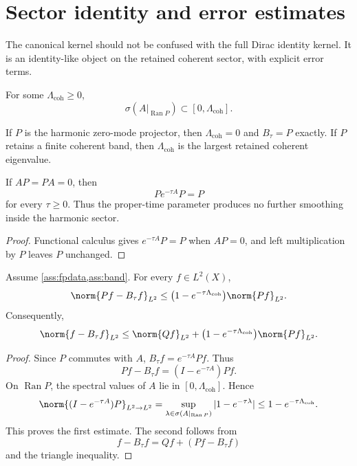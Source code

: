 \documentclass[11pt]{article}
\begin{document}
\section{Sector identity and error estimates}

The canonical kernel should not be confused with the full Dirac identity kernel. It is an
identity-like object on the retained coherent sector, with explicit error terms.

\begin{assumption}\label{ass:band}
For some \(\Lambda_{\mathrm{coh}}\ge 0\),
\[
        \sigma(A|_{\operatorname{Ran}P})\subset[0,\Lambda_{\mathrm{coh}}].
\]
\end{assumption}

\begin{remark}
If \(P\) is the harmonic zero-mode projector, then \(\Lambda_{\mathrm{coh}}=0\) and
\(B_\tau=P\) exactly. If \(P\) retains a finite coherent band, then
\(\Lambda_{\mathrm{coh}}\) is the largest retained coherent eigenvalue.
\end{remark}

\begin{proposition}\label{prop:harmonic}
If \(AP=PA=0\), then
\[
        Pe^{-\tau A}P=P
\]
for every \(\tau\ge0\).  Thus the proper-time parameter produces no further
smoothing inside the harmonic sector.
\end{proposition}

\begin{proof}
Functional calculus gives \(e^{-\tau A}P=P\) when \(AP=0\), and left
multiplication by \(P\) leaves \(P\) unchanged.
\end{proof}

\begin{theorem}\label{thm:sector}
Assume \cref{ass:fpdata,ass:band}. For every \(f\in L^2(X)\),
\[
        \norm{Pf-B_\tau f}_{L^2}
        \le
        \bigl(1-e^{-\tau\Lambda_{\mathrm{coh}}}\bigr)\norm{Pf}_{L^2}.
\]
Consequently,
\[
        \norm{f-B_\tau f}_{L^2}
        \le
        \norm{Qf}_{L^2}
        +
        \bigl(1-e^{-\tau\Lambda_{\mathrm{coh}}}\bigr)\norm{Pf}_{L^2}.
\]
\end{theorem}

\begin{proof}
Since \(P\) commutes with \(A\), \(B_\tau f=e^{-\tau A}Pf\). Thus
\[
        Pf-B_\tau f
        =
        (I-e^{-\tau A})Pf.
\]
On \(\operatorname{Ran}P\), the spectral values of \(A\) lie in
\([0,\Lambda_{\mathrm{coh}}]\). Hence
\[
        \norm{(I-e^{-\tau A})P}_{L^2\to L^2}
        =
        \sup_{\lambda\in\sigma(A|_{\operatorname{Ran}P})}
        |1-e^{-\tau\lambda}|
        \le
        1-e^{-\tau\Lambda_{\mathrm{coh}}}.
\]
This proves the first estimate. The second follows from
\[
        f-B_\tau f
        =
        Qf+(Pf-B_\tau f)
\]
and the triangle inequality.
\end{proof}
\end{document}
